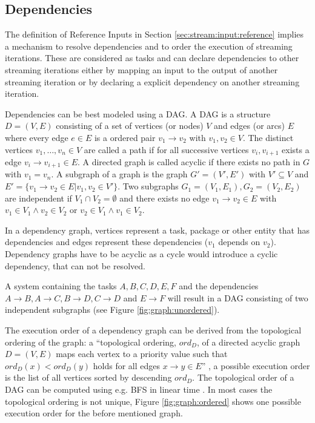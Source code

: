	\subsection{Dependencies}\label{sec:stream:dependencies}
		The definition of Reference Inputs in Section \ref{sec:stream:input:reference} implies a mechanism to resolve dependencies and to order the execution of streaming iterations. These are considered as tasks and can declare dependencies to other streaming iterations either by mapping an input to the output of another streaming iteration or by declaring a explicit dependency on another streaming iteration.

		Dependencies can be best modeled using a \ac{DAG}. A \ac{DAG} is a structure $D=(V, E)$ consisting of a set of vertices (or nodes) $V$ and edges (or arcs) $E$ where every edge $e\in E$ is a ordered pair $v_1 \rightarrow v_2$ with $v_1, v_2 \in V$. The distinct vertices $v_1,\dots,v_n\in V$ are called a path if for all successive vertices $v_i, v_{i+1}$ exists a edge $v_i \rightarrow v_{i+1} \in E$. A directed graph is called acyclic if there exists no path in $G$ with $v_1 = v_n$. A subgraph of a graph is the graph $G' = (V', E')$ with $V'\subseteq V$ and $E' = \{v_1 \rightarrow v_2 \in E | v_1, v_2\in V'\}$. Two subgraphs $G_1 = (V_1, E_1), G_2 = (V_2, E_2)$ are independent if $V_1 \cap V_2 = \emptyset$ and there exists no edge $v_1\rightarrow v_2\in E$ with $v_1\in V_1 \wedge v_2\in V_2$ or $v_2\in V_1 \wedge v_1\in V_2$.


		In a dependency graph, vertices represent a task, package or other entity that has dependencies and edges represent these dependencies ($v_1$ depends on $v_2$). Dependency graphs have to be acyclic as a cycle would introduce a cyclic dependency, that can not be resolved.

		A system containing the tasks $A, B, C, D, E, F$ and the dependencies $A\rightarrow B, A\rightarrow C, B\rightarrow D, C\rightarrow D$ and $E\rightarrow F$ will result in a \ac{DAG} consisting of two independent subgraphs (see Figure \ref{fig:graph:unordered}).

		The execution order of a dependency graph can be derived from the topological ordering of the graph: a ``topological ordering, $ord_D$, of a directed acyclic graph $D = (V, E)$ maps each vertex to a priority value such that $ord_{D}(x) < ord_{D}(y)$ holds for all edges $x \rightarrow y \in E$'' \citep{pearce2007dynamic}, a possible execution order is the list of all vertices sorted by descending $ord_D$. The topological order of a \ac{DAG} can be computed using e.g. \ac{BFS} in linear time \citep{cormen2001introduction}. In most cases the topological ordering is not unique, Figure \ref{fig:graph:ordered} shows one possible execution order for the before mentioned graph.

